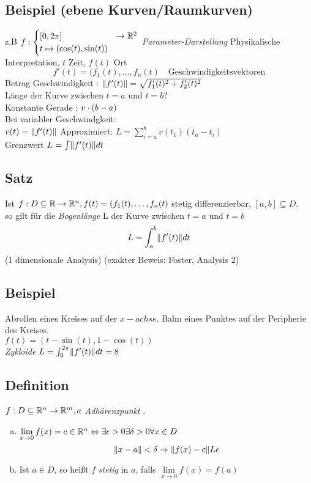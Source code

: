 \subsection{Beispiel (ebene Kurven/Raumkurven)}
z.B $f : \begin{cases}
[0,2\pi] &\to \mathbb{R}^2\\
t \mapsto (\cos(t),\sin(t))
\end{cases}$ \emph{Parameter-Darstellung}
Physikalische Interpretation, $t$ Zeit, $f(t)$ Ort\\
\[f'(t) = (f_1(t),\ldots, f_n(t)\quad \text{Geschwindigkeitsvektoren}  \]
Betrag Geschwindigkeit : $\Vert f'(t)\Vert = \sqrt{f_1'(t)^2 + f_2'(t)^2}$\\
Länge der Kurve zwischen $t = a$ und $t = b$?\\
Konstante Gerade : $v \cdot (b-a)$\\
Bei variabler Geschwindgkeit:\\
$v(t) = \Vert f'(t)\Vert$ Approximiert: $L = \sum\limits^{b}_{i=a} v(t_1) (t_a - t_i)$\\
Grenzwert $L = \int\norm{f'(t)}dt$
\subsection{Satz}
Ist $f : D \subseteq \mathbb{R} \to \mathbb{R}^n, f(t) = (f_1(t),\ldots, f_n(t)$ stetig differenzierbar, $[a,b] \subseteq D$.\\
so gilt für die \emph{Bogenlänge} L der Kurve zwischen $t =a$ und $t=b$\\
\[L = \int_a^b \norm{f'(t)}dt   \]
(1 dimensionale Analysis) \hfill (exakter Beweis: Foster, Analysis 2)
\subsection{Beispiel}
Abrollen eines Kreises auf  der $x-achse$. Bahn eines Punktes auf der Peripherie des Kreises.\\
$f(t) = (t-\sin(t),1-\cos(t) )$\\
{\em Zykloide} $L = \int^{2\pi}_0\norm{f'(t)} dt = 8$
\subsection{Definition}
$f : D \subseteq \mathbb{R}^n \to \mathbb{R}^m, a$ \emph{Adhärenzpunkt} .
\begin{enumerate}[a)]
\item $\lim\limits_{x \to 0}f(x) = c \in \mathbb{R}^n \Leftrightarrow \exists \epsilon > 0 \exists \delta > 0 \forall x \in D$\\
\[ \Vert x-a\Vert < \delta \Rightarrow \Vert f(x) - c\Vert L \epsilon \]
\item Ist $a \in D$, so hei\ss t $f$ \emph{stetig} in $a$, falls $\lim\limits_{x \to 0} f(x) = f(a)$
\end{enumerate}
